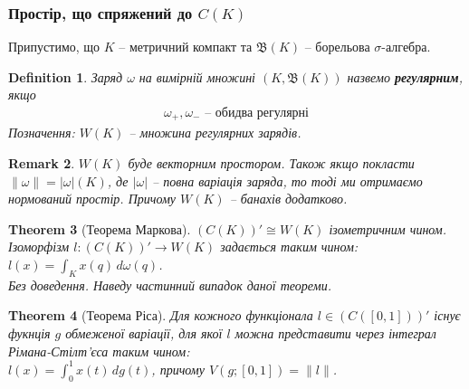 \documentclass[a4paper, 10pt]{article}
\theoremstyle{theoremdd}
\newtheorem{theorem}{Theorem}[subsection]
\theoremstyle{theoremdd}
\newtheorem{definition}[theorem]{Definition}
\theoremstyle{theoremdd}
\theoremstyle{theoremdd}
\theoremstyle{theoremdd}
\theoremstyle{theoremdd}
\newtheorem{remark}[theorem]{Remark}
\theoremstyle{theoremdd}
\theoremstyle{theoremdd}
\begin{document}
\subsubsection{Простір, що спряжений до $C(K)$}
Припустимо, що $K$ -- метричний компакт та $\mathfrak{B}(K)$ -- борельова $\sigma$-алгебра.

\begin{definition}
Заряд $\omega$ на вимірній множині $(K, \mathfrak{B}(K))$ назвемо \textbf{регулярним}, якщо
\begin{align*}
\omega_+, \omega_- \text{ -- обидва регулярні}
\end{align*}
Позначення: $W(K)$ -- множина регулярних зарядів.
\end{definition}

\begin{remark}
$W(K)$ буде векторним простором. Також якщо покласти $\|\omega\| = |\omega|(K)$, де $|\omega|$ -- повна варіація заряда, то тоді ми отримаємо нормований простір. Причому $W(K)$ -- банахів додатково.
\end{remark}

\begin{theorem}[Теорема Маркова]
$(C(K))' \cong W(K)$ ізометричним чином. Ізоморфізм $l \colon (C(K))' \to W(K)$ задається таким чином:\\
$l(x) = \displaystyle\int_K x(q)\,d\omega(q)$.\\
\textit{Без доведення. Наведу частинний випадок даної теореми.}
\end{theorem}

\begin{theorem}[Теорема Ріса]
Для кожного функціонала $l \in (C([0,1]))'$ існує фукнція $g$ обмеженої варіації, для якої $l$ можна представити через інтеграл Рімана-Стілт'єса таким чином:\\
$l(x) = \displaystyle\int_0^1 x(t)\,dg(t)$, причому $V(g;[0,1]) = \|l\|$.
\end{theorem}
\end{document}
